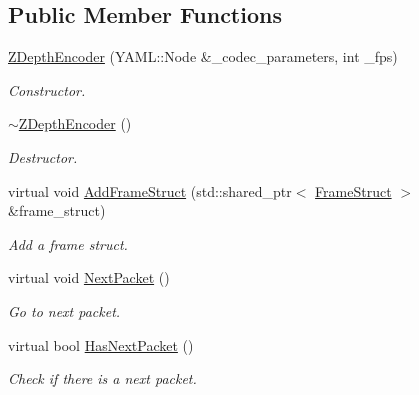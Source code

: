 \subsection*{Public Member Functions}
\begin{DoxyCompactItemize}
\item 
\hyperlink{classmoetsi_1_1ssp_1_1ZDepthEncoder_a97902734a32136d68782f4b8c9bf111c}{Z\+Depth\+Encoder} (Y\+A\+M\+L\+::\+Node \&\+\_\+codec\+\_\+parameters, int \+\_\+fps)
\begin{DoxyCompactList}\small\item\em Constructor. \end{DoxyCompactList}\item 
\mbox{\label{classmoetsi_1_1ssp_1_1ZDepthEncoder_ae668b2baffa6d7debb78608f488cd466}} 
\hyperlink{classmoetsi_1_1ssp_1_1ZDepthEncoder_ae668b2baffa6d7debb78608f488cd466}{$\sim$\+Z\+Depth\+Encoder} ()
\begin{DoxyCompactList}\small\item\em Destructor. \end{DoxyCompactList}\item 
virtual void \hyperlink{classmoetsi_1_1ssp_1_1ZDepthEncoder_a382e94eab7789cb4437b9711e5292343}{Add\+Frame\+Struct} (std\+::shared\+\_\+ptr$<$ \hyperlink{structmoetsi_1_1ssp_1_1FrameStruct}{Frame\+Struct} $>$ \&frame\+\_\+struct)
\begin{DoxyCompactList}\small\item\em Add a frame struct. \end{DoxyCompactList}\item 
\mbox{\label{classmoetsi_1_1ssp_1_1ZDepthEncoder_ae3911f396fc8b86c04c94dc71e1c0672}} 
virtual void \hyperlink{classmoetsi_1_1ssp_1_1ZDepthEncoder_ae3911f396fc8b86c04c94dc71e1c0672}{Next\+Packet} ()
\begin{DoxyCompactList}\small\item\em Go to next packet. \end{DoxyCompactList}\item 
virtual bool \hyperlink{classmoetsi_1_1ssp_1_1ZDepthEncoder_ac11aa1369150c2aa5ffa1d70d4e6ad5d}{Has\+Next\+Packet} ()
\begin{DoxyCompactList}\small\item\em Check if there is a next packet. \end{DoxyCompactList}\item 

\end{DoxyCompactItemize}
